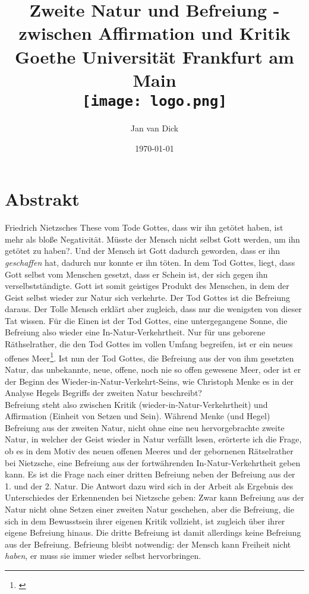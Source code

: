 \documentclass[12pt, a4paper, openany]{report}
\title{
    {Zweite Natur und Befreiung - zwischen Affirmation und Kritik}\\
    {\large Goethe Universität Frankfurt am Main}\\
    {\texttt{[image: logo.png]}}
}
\author{Jan van Dick}
\date{\today}
\newcommand\frontmatter{ \cleardoublepage \pagenumbering{roman}}
\begin{document}
\frontmatter
\maketitle

\chapter*{Abstrakt}
Friedrich Nietzsches These vom Tode Gottes, dass \glqq wir\grqq{} ihn getötet haben, ist mehr als bloße Negativität. 
Müsste der Mensch nicht selbst Gott werden, um ihn getötet zu haben?. 
Und der Mensch ist Gott dadurch geworden, dass er ihn \textit{geschaffen} hat, dadurch nur konnte er ihn töten. 
In dem Tod Gottes, liegt, dass Gott selbst vom Menschen gesetzt, dass er Schein ist, der sich gegen ihn verselbstständigte.
Gott ist somit geistiges Produkt des Menschen, in dem der Geist selbst wieder zur Natur sich verkehrte.
Der Tod Gottes ist die Befreiung daraus.
Der \glqq Tolle Mensch\grqq{} erklärt aber zugleich, dass nur die wenigsten von dieser Tat wissen. 
Für die Einen ist der Tod Gottes, eine untergegangene Sonne, die Befreiung also wieder eine In-Natur-Verkehrtheit.
Nur für uns \glqq geborene Räthselrather\grqq, die den Tod Gottes im vollen Umfang begreifen, ist er ein \glqq neues offenes Meer\grqq\footnote{\citeauthor[][573]{nietzsche_morgenrote_1999}}.
Ist nun der Tod Gottes, die Befreiung aus der von ihm gesetzten Natur, das unbekannte, neue, offene, noch nie so offen gewesene Meer, oder ist er der Beginn des Wieder-in-Natur-Verkehrt-Seins, wie Christoph Menke es in der Analyse Hegels Begriffs der zweiten Natur beschreibt?\\
Befreiung steht also zwischen Kritik (wieder-in-Natur-Verkehrtheit) und Affirmation (Einheit von Setzen und Sein).
Während Menke (und Hegel) Befreiung aus der zweiten Natur, nicht ohne eine neu hervorgebrachte zweite Natur, in welcher der Geist wieder in Natur verfällt lesen, erörterte ich die Frage, ob es in dem Motiv des \glqq neuen offenen Meeres\grqq{} und der \glqq gebornenen Rätselrather\grqq{} bei Nietzsche, eine Befreiung aus der fortwährenden In-Natur-Verkehrtheit geben kann.
Es ist die Frage nach einer dritten Befreiung neben der Befreiung aus der 1. und der 2. Natur. 
Die Antwort dazu wird sich in der Arbeit als Ergebnis des Unterschiedes der \glqq Erkennenden\grqq{} bei Nietzsche geben:
Zwar kann Befreiung aus der Natur nicht ohne Setzen einer zweiten Natur geschehen, aber die Befreiung, die sich in dem Bewusstsein ihrer eigenen Kritik vollzieht, ist zugleich über ihrer eigene Befreiung hinaus.
Die dritte Befreiung ist damit allerdings keine Befreiung aus der Befreiung.
Befrieung bleibt notwendig: der Mensch kann Freiheit nicht \textit{haben}, er muss sie immer wieder selbst hervorbringen.
\end{document}
